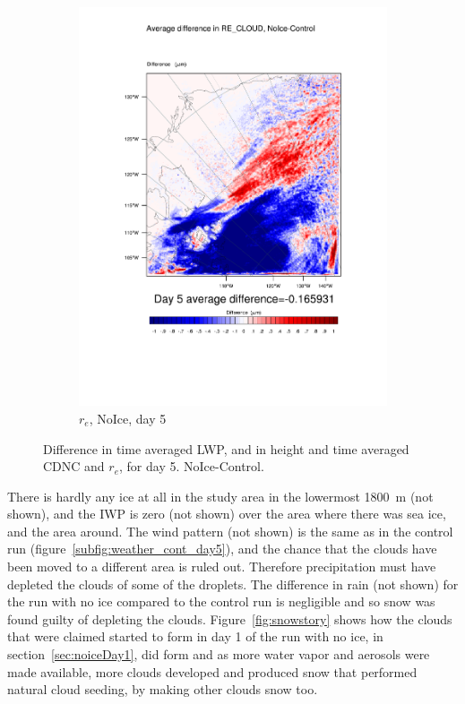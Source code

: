 \begin{figure}[hb]
	\begin{subfigure}{0.40\textwidth}
		\centering
		\includegraphics[width=\textwidth]{results/noice/diff_NoIce_RE_CLOUD_Day5.pdf}
		\caption{$r_e$, NoIce, day 5}
		\label{subfig:recloud_r2Day5}
	\end{subfigure}
\caption{Difference in time averaged LWP, and in height and time averaged CDNC and $r_e$, for day 5. NoIce-Control.}
\label{fig:lwpcdncre_r2Day5}
\end{figure}

There is hardly any ice at all in the study area in the lowermost 1800~m (not shown), and the IWP is zero (not shown) over the area where there was sea ice, and the area around. The wind pattern (not shown) is the same as in the control run (figure~\ref{subfig:weather_cont_day5}), and the chance that the clouds have been moved to a different area is ruled out. Therefore precipitation must have depleted the clouds of some of the droplets. The difference in rain (not shown) for the run with no ice compared to the control run is negligible and so snow was found guilty of depleting the clouds. Figure~\ref{fig:snowstory} shows how the clouds that were claimed started to form in day 1 of the run with no ice, in section~\ref{sec:noiceDay1}, did form and as more water vapor and aerosols were made available, more clouds developed and produced snow that performed natural cloud seeding, by making other clouds snow too.


